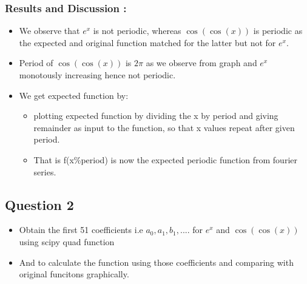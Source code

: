 \documentclass[11pt, a4paper]{article}
\begin{document}
     \subsubsection{Results and Discussion :}\label{results-and-discussion}
     \begin{itemize}
     \item
       We observe that \(e^{x}\) is not periodic, whereas \(\cos(\cos(x))\)
       is periodic as the expected and original function matched for the
       latter but not for \(e^{x}\).
     \item
       Period of \(\cos(\cos(x))\) is \(2\pi\) as we observe from graph and
       \(e^{x}\) monotously increasing hence not periodic.
     \item
       We get expected function by:
     
       \begin{itemize}
       \item
         plotting expected function by dividing the x by period and giving
         remainder as input to the function, so that x values repeat after
         given period.
       \item
         That is f(x\%period) is now the expected periodic function from
         fourier series.
       \end{itemize}
     \end{itemize}
     \break
     \subsection{Question 2}\label{question-2}

     \begin{itemize}
     \item
       Obtain the first 51 coefficients i.e \(a_{0}, a_{1}, b_{1},....\) for
       \(e^{x}\) and \(\cos(\cos(x))\) using scipy quad function
     \item
       And to calculate the function using those coefficients and comparing
       with original funcitons graphically.
     \end{itemize}
     
\end{document}
